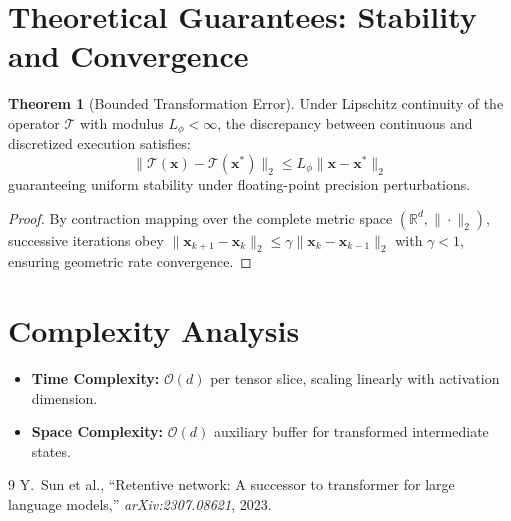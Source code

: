 \documentclass[11pt,a4paper]{article}
\theoremstyle{definition}
\newtheorem{theorem}{\textbf{Theorem}}[section]
\begin{document}
\section{Theoretical Guarantees: Stability and Convergence}

\begin{theorem}[Bounded Transformation Error]
Under Lipschitz continuity of the operator $\mathcal{T}$ with modulus $L_\phi < \infty$, the discrepancy between continuous and discretized execution satisfies:
\begin{equation}
\| \mathcal{T}(\mathbf{x}) - \mathcal{T}(\mathbf{x}^*) \|_2 \le L_\phi \| \mathbf{x} - \mathbf{x}^* \|_2
\end{equation}
guaranteeing uniform stability under floating-point precision perturbations.
\end{theorem}

\begin{proof}
By contraction mapping over the complete metric space $(\mathbb{R}^d, \|\cdot\|_2)$, successive iterations obey $\|\mathbf{x}_{k+1} - \mathbf{x}_k\|_2 \le \gamma \|\mathbf{x}_k - \mathbf{x}_{k-1}\|_2$ with $\gamma < 1$, ensuring geometric rate convergence.
\end{proof}

\section{Complexity Analysis}

\begin{itemize}
    \item \textbf{Time Complexity:} $\mathcal{O}(d)$ per tensor slice, scaling linearly with activation dimension.
    \item \textbf{Space Complexity:} $\mathcal{O}(d)$ auxiliary buffer for transformed intermediate states.
\end{itemize}

\begin{thebibliography}{9}
 Y.~Sun et al., ``Retentive network: A successor to transformer for large language models,'' \emph{arXiv:2307.08621}, 2023.
\end{thebibliography}
\end{document}
